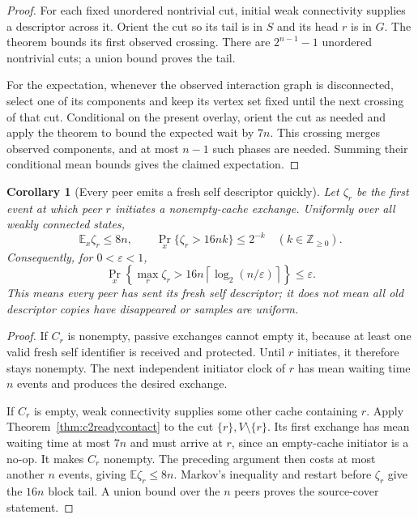 \documentclass[11pt]{article}
\newtheorem{corollary}[theorem]{Corollary}
\begin{document}
\begin{proof}
For each fixed unordered nontrivial cut, initial
weak connectivity supplies a descriptor across it.
Orient the cut so its tail is in $S$ and its
head $r$ is in $G$. The theorem bounds its
first observed crossing. There are
$2^{n-1}-1$ unordered nontrivial cuts; a union
bound proves the tail.

For the expectation, whenever the observed
interaction graph is disconnected, select one
of its components and keep its vertex set
fixed until the next crossing of that cut.
Conditional on the present overlay, orient the cut as
needed and apply the theorem to bound the expected wait by $7n$.
This crossing merges observed components,
and at most $n-1$ such phases are needed.
Summing their conditional mean bounds gives
the claimed expectation.
\end{proof}



\begin{corollary}[Every peer emits a fresh self descriptor quickly]
\label{cor:c2successfulsourcecover}
Let $\zeta_r$ be the first event at which peer $r$
initiates a nonempty-cache exchange. Uniformly over
all weakly connected states,
\[
 \mathbb E_x\zeta_r\le8n,\qquad
 \Pr_x\{\zeta_r>16nk\}\le2^{-k}\quad(k\in\mathbb Z_{\ge0}).
\]
Consequently, for $0<\varepsilon<1$,
\[
 \Pr_x\!\left\{\max_r\zeta_r>
 16n\left\lceil\log_2(n/\varepsilon)\right\rceil
 \right\}\le\varepsilon.
\]
This means every peer has sent its fresh self
descriptor; it does not mean all old descriptor
copies have disappeared or samples are uniform.
\end{corollary}
\begin{proof}
If $C_r$ is nonempty, passive exchanges cannot
empty it, because at least one valid fresh self
identifier is received and protected. Until $r$
initiates, it therefore stays nonempty.
The next independent initiator clock of $r$
has mean waiting time $n$ events and produces
the desired exchange.

If $C_r$ is empty, weak connectivity supplies
some other cache containing $r$.
Apply Theorem~\ref{thm:c2readycontact} to the cut
$\{r\},V\setminus\{r\}$. Its first exchange has
mean waiting time at most $7n$ and must arrive
at $r$, since an empty-cache initiator is a
no-op. It makes $C_r$ nonempty.
The preceding argument then costs at most
another $n$ events, giving $\mathbb E\zeta_r\le8n$.
Markov's inequality and restart before $\zeta_r$
give the $16n$ block tail. A union bound over
the $n$ peers proves the source-cover statement.
\end{proof}
\end{document}

